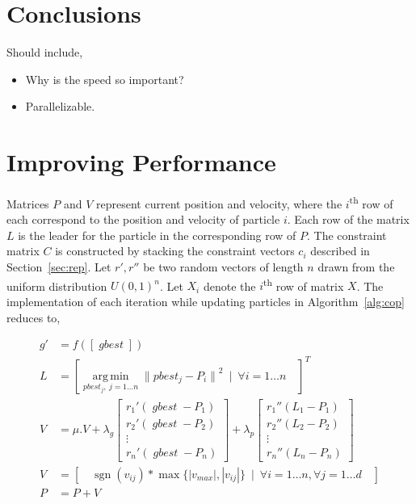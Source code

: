 \documentclass[10pt]{article}
\newenvironment{pointers}{%
  \noindent Should include,
  \begin{itemize}
    \setlength{\itemsep}{-1pt}}{%
\end{itemize}}
\DeclareMathOperator*{\argmin}{arg\,min}
\DeclareMathOperator*{\sgn}{sgn}
\DeclareMathOperator*{\gbest}{\mathit{gbest}}
\begin{document}
\section{Conclusions}
\begin{pointers}
\item Why is the speed so important?
\item Parallelizable.
\end{pointers}


\appendix


\section{Improving Performance}\label{app:imp}

Matrices $P$ and $V$ represent current position and velocity, where the $i$\textsuperscript{th} row of each correspond
to the position and velocity of particle $i$. Each row of the matrix $L$ is the leader for the particle in the
corresponding row of $P$. The constraint matrix $C$ is constructed by stacking the constraint vectors $c_i$ described in
Section~\ref{sec:rep}. Let $r',r''$ be two random vectors of length $n$ drawn from the uniform distribution
${U(0,1)}^n$. Let $X_i$ denote the $i$\textsuperscript{th} row of matrix $X$. The implementation of each iteration while
updating particles in Algorithm~\ref{alg:cop} reduces to,

\begin{align*}
  g' &= f([\gbest])\\
  L  &= {[\argmin\limits_{pbest_j,\ j = 1\dots n} {\|pbest_j - P_i\|}^2\ \mid\ \forall i = 1\dots n\quad ]}^T\\
  V  &= \mu.V + \lambda_g\begin{bmatrix}
    {r_1}'(\gbest - P_1)\\
    {r_2}'(\gbest - P_2)\\
    \vdots\\
    {r_n}'(\gbest - P_n)
  \end{bmatrix} + \lambda_p\begin{bmatrix}
    {r_1}''(L_1 - P_1)\\
    {r_2}''(L_2 - P_2)\\
    \vdots\\
    {r_n}''(L_n - P_n)
  \end{bmatrix}\\
  V  &= [\quad\sgn(v_{ij})*\max\{|v_{max}|,|v_{ij}|\}\ \mid\ \forall i=1\dots n,\forall j=1\dots d\quad]\\
  P  &= P + V\\
\end{align*}
\end{document}
